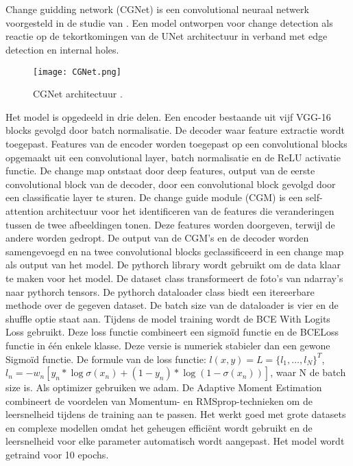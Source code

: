 \section{}%
\label{sec:cgnet}
Change guidding network (CGNet) is een convolutional neuraal netwerk voorgesteld in de studie van \textcite{Han2023}. 
Een model ontworpen voor change detection als reactie op de tekortkomingen van de UNet architectuur in verband met edge detection en 
internal holes.
\newline
\newline
\begin{figure*}
  \centering
  \texttt{[image: CGNet.png]}
  \caption{\label{fig:CGNet}CGNet architectuur \autocite{Han2023}.}
\end{figure*}
Het model is opgedeeld in drie delen. Een encoder bestaande uit vijf VGG-16 blocks gevolgd door batch normalisatie. De decoder waar 
feature extractie wordt toegepast. Features van de encoder worden toegepast op een convolutional blocks opgemaakt uit een convolutional
layer, batch normalisatie en de ReLU activatie functie. De change map ontstaat door deep features, output van de eerste convolutional block
van de decoder, door een convolutional block gevolgd door een classificatie layer te sturen. De change guide module (CGM) is een self-attention 
architectuur voor het identificeren van de features die veranderingen tussen de twee afbeeldingen tonen. Deze features worden doorgeven, 
terwijl de andere worden gedropt. De output van de CGM's en de decoder worden samengevoegd en na twee convolutional blocks 
geclassificeerd in een change map als output van het model.
\newline
\newline
De pythorch library wordt gebruikt om de data klaar te maken voor het model. De dataset class transformeert de foto's van ndarray's naar 
pythorch tensors. De pythorch dataloader class biedt een itereerbare methode over de gegeven dataset. De batch size van de dataloader is vier en
de shuffle optie staat aan.
\newline
\newline
Tijdens de model training wordt de BCE With Logits Loss gebruikt. Deze loss functie 
combineert een sigmoïd functie en de BCELoss functie in één enkele klasse. Deze versie is numeriek stabieler dan een gewone Sigmoïd functie. 
De formule van de loss functie: \(l(x,y) = L = \{l_1,\ldots,l_N\}^T \), \(l_n = -w_n[y_n * \log\sigma(x_n) + (1-y_n) * 
\log(1 - \sigma(x_n))] \), waar N de batch size is.
\newline
\newline
Als optimizer gebruiken we adam. De Adaptive Moment Estimation combineert de voordelen van Momentum- en RMSprop-technieken om de 
leersnelheid tijdens de training aan te passen. Het werkt goed met grote datasets en complexe modellen omdat het geheugen efficiënt 
wordt gebruikt en de leersnelheid voor elke parameter automatisch wordt aangepast. Het model wordt getraind voor 10 epochs.

